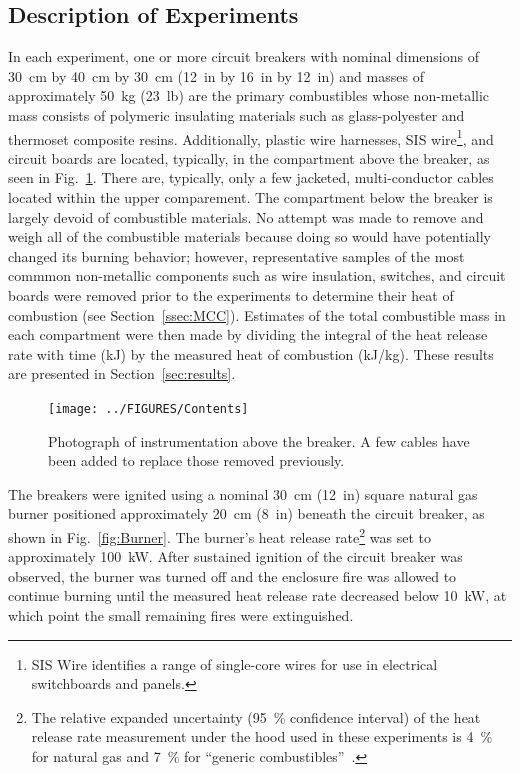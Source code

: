 \subsection{Description of Experiments}

In each experiment, one or more circuit breakers with nominal dimensions of 30~cm by 40~cm by 30~cm (12~in by 16~in by 12~in) and masses of approximately 50~kg (23~lb) are the primary combustibles whose non-metallic mass consists of polymeric insulating materials such as glass-polyester and thermoset composite resins. Additionally, plastic wire harnesses, SIS wire\footnote{SIS Wire identifies a range of single-core wires for use in electrical switchboards and panels.}, and circuit boards are located, typically, in the compartment above the breaker, as seen in Fig.~\ref{fig:Contents}. There are, typically, only a few jacketed, multi-conductor cables located within the upper comparement. The compartment below the breaker is largely devoid of combustible materials. No attempt was made to remove and weigh all of the combustible materials because doing so would have potentially changed its burning behavior; however, representative samples of the most commmon non-metallic components such as wire insulation, switches, and circuit boards were removed prior to the experiments to determine their heat of combustion (see Section~\ref{ssec:MCC}). Estimates of the total combustible mass in each compartment were then made by dividing the integral of the heat release rate with time (kJ) by the measured heat of combustion (kJ/kg). These results are presented in Section~\ref{sec:results}.

\begin{figure}[ht]
\centering
\texttt{[image: ../FIGURES/Contents]}
\caption[Photograph of instrumentation above the breaker] {Photograph of instrumentation above the breaker. A few cables have been added to replace those removed previously.}
\label{fig:Contents}
\end{figure}

The breakers were ignited using a nominal 30~cm (12~in) square natural gas burner positioned approximately 20~cm (8~in) beneath the circuit breaker, as shown in Fig.~\ref{fig:Burner}. The burner's heat release rate\footnote{The relative expanded uncertainty (95~\% confidence interval) of the heat release rate measurement under the hood used in these experiments is 4~\% for natural gas and 7~\% for ``generic combustibles''~\cite{bryant2019nist}.} was set to approximately 100~kW. After sustained ignition of the circuit breaker was observed, the burner was turned off and the enclosure fire was allowed to continue burning until the measured heat release rate decreased below 10~kW, at which point the small remaining fires were extinguished.

